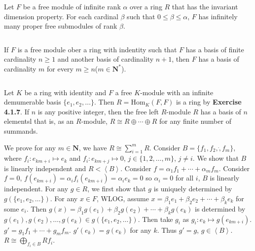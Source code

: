 $$ $$

\begin{ex}
    Let $F$ be a free module of infinite rank $\alpha$ over a ring $R$ that has the invariant dimension property. For each cardinal $\beta$ such that $0\leq \beta\leq \alpha$, $F$ has infinitely many proper free submodules of rank $\beta$.
\end{ex}

$$ $$

\begin{ex}
    If $F$ is a free module ober a ring with indentity such that $F$ has a basis of finite cardinality $n\geq 1$ and another basis of cardinality $n+1$, then $F$ has a basis of cardinality $m$ for every $m\geq n$($m\in \mathbf{N}^{*}$).
\end{ex}

$$ $$

\begin{ex}
    Let $K$ be a ring with identity and $F$ a free $K$-module with an infinite demumerable basis $\{e_{1},e_{2},\dots\}$. Then $R=\mathrm{Hom}_{K}(F,F)$ is a ring by \textbf{Exercise 4.1.7}. If $n$ is any positive integer, then the free left $R$-module $R$ has a basis of $n$ elementsl that is,  as an $R$-module, $R\cong R\oplus\cdots\oplus R$ for any finite number of summands.
\end{ex}

\begin{answer}
    We prove for any $m\in \mathbf{N}$, we have $R\cong \sum\limits_{i=1}^{m}R$. Consider $B=\{f_{1}, f_{2}, \dot, f_{m}\}$, where $f_{i}:e_{km+i}\mapsto e_{k}$ and $f_{i}:e_{km+j}\mapsto 0$, $j\in \{1,2,\dots,m\}$, $j\neq i$. We show that $B$ is linearly independent and $R<\left\langle B\right\rangle$. Consider $f=\alpha_{1}f_{1}+\cdots+\alpha_{m}f_{m}$. Consider $f=0$, $f(e_{km+i})=\alpha_{i}f_{i}(e_{km+i})=\alpha_{i}e_{k}=0$ so $\alpha_{i}=0$ for all $i$, $B$ is linearly independent. For any $g\in R$, we first show that $g$ is uniquely determined by $g(\{e_{1},e_{2},\dots\})$. For any $x\in F$, WLOG, assume $x=\beta_{1}e_{1}+\beta_{2}e_{2}+\cdots+\beta_{k}e_{k}$ for some $e_{i}$. Then $g(x)=\beta_{1}g(e_{1})+\beta_{2}g(e_{2})+\cdots+\beta_{k}g(e_{k})$ is determined by $g(e_{1}), g(e_{2}),\dots, g(e_{k})\in g(\{e_{1},e_{2},\dots\})$. Then take $g_{i}$ as $g_{i}:e_{k}\mapsto g(e_{km+i})$. $g'=g_{1}f_{1}+\cdots+g_{m}f_{m}$. $g'(e_{k})=g(e_{k})$ for any $k$. Thus $g'=g$, $g\in \left\langle B\right\rangle$. $R\cong \bigoplus\limits_{f_{i}\in B}Rf_{i}$.
\end{answer}

